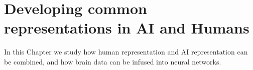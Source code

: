 \chapter{Developing common representations in AI and Humans}
\label{chap:common_representations}

In this Chapter we study how human representation and AI representation can be combined, and how brain data can be infused into neural networks.

